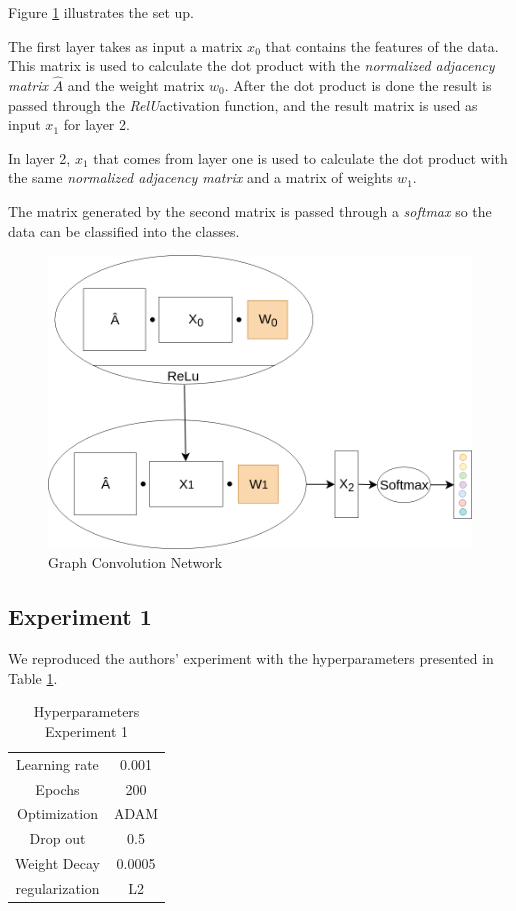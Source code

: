 Figure \ref{fig:model} illustrates the set up.

The first layer takes as input a matrix $x_{0}$ that contains the features of the data. This matrix is used to calculate the dot product with the \textit{normalized adjacency matrix} $\hat{A}$ and the weight matrix $w_{0}$. After the dot product is done the result is passed through the \textit{RelU}activation function, and the result matrix is used as input $x_{1}$ for layer 2.

In layer 2, $x_{1}$ that comes from layer one is used to calculate the dot product with the same \textit{normalized adjacency matrix} and a matrix of weights $w_{1}$.

The matrix generated by the second matrix is passed through a \textit{softmax} so the data can be classified into the classes.

\begin{figure}[h!]
  \includegraphics[width=\linewidth]{media/model.png}
  \caption{Graph Convolution Network}
  \label{fig:model}
\end{figure}

\subsection{Experiment 1}

We reproduced the authors' experiment with the hyperparameters presented in Table \ref{tab:hyperparameters1}.

\begin {table}[ht]
\caption {Hyperparameters Experiment 1} \label{tab:hyperparameters1} 
  \begin{center}
    \begin{tabular}{|c|c|}
    \hline
    Learning rate     & 0.001 \\ 
    Epochs            & 200  \\ 
    Optimization      & ADAM \\
    Drop out          & 0.5   \\
    Weight Decay      & 0.0005 \\
    regularization    & L2    \\
    \hline
    \end{tabular}
  \end{center}
\end{table}

